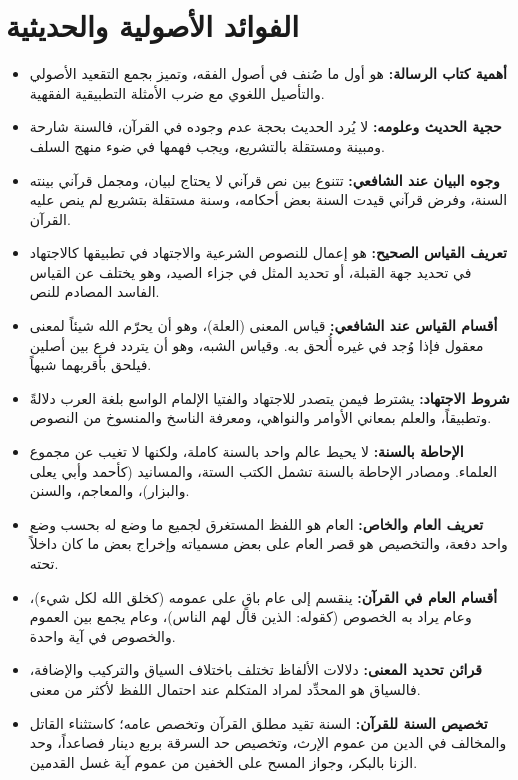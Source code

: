 \section{الفوائد الأصولية والحديثية}
\begin{itemize}
    \item \textbf{أهمية كتاب الرسالة:} هو أول ما صُنف في أصول الفقه، وتميز بجمع التقعيد الأصولي والتأصيل اللغوي مع ضرب الأمثلة التطبيقية الفقهية.
    \item \textbf{حجية الحديث وعلومه:} لا يُرد الحديث بحجة عدم وجوده في القرآن، فالسنة شارحة ومبينة ومستقلة بالتشريع، ويجب فهمها في ضوء منهج السلف.
    \item \textbf{وجوه البيان عند الشافعي:} تتنوع بين نص قرآني لا يحتاج لبيان، ومجمل قرآني بينته السنة، وفرض قرآني قيدت السنة بعض أحكامه، وسنة مستقلة بتشريع لم ينص عليه القرآن.
    \item \textbf{تعريف القياس الصحيح:} هو إعمال للنصوص الشرعية والاجتهاد في تطبيقها كالاجتهاد في تحديد جهة القبلة، أو تحديد المثل في جزاء الصيد، وهو يختلف عن القياس الفاسد المصادم للنص.
    \item \textbf{أقسام القياس عند الشافعي:} قياس المعنى (العلة)، وهو أن يحرّم الله شيئاً لمعنى معقول فإذا وُجد في غيره أُلحق به. وقياس الشبه، وهو أن يتردد فرع بين أصلين فيلحق بأقربهما شبهاً.
    \item \textbf{شروط الاجتهاد:} يشترط فيمن يتصدر للاجتهاد والفتيا الإلمام الواسع بلغة العرب دلالةً وتطبيقاً، والعلم بمعاني الأوامر والنواهي، ومعرفة الناسخ والمنسوخ من النصوص.
    \item \textbf{الإحاطة بالسنة:} لا يحيط عالم واحد بالسنة كاملة، ولكنها لا تغيب عن مجموع العلماء. ومصادر الإحاطة بالسنة تشمل الكتب الستة، والمسانيد (كأحمد وأبي يعلى والبزار)، والمعاجم، والسنن.
    \item \textbf{تعريف العام والخاص:} العام هو اللفظ المستغرق لجميع ما وضع له بحسب وضع واحد دفعة، والتخصيص هو قصر العام على بعض مسمياته وإخراج بعض ما كان داخلاً تحته.
    \item \textbf{أقسام العام في القرآن:} ينقسم إلى عام باقٍ على عمومه (كخلق الله لكل شيء)، وعام يراد به الخصوص (كقوله: الذين قال لهم الناس)، وعام يجمع بين العموم والخصوص في آية واحدة.
    \item \textbf{قرائن تحديد المعنى:} دلالات الألفاظ تختلف باختلاف السياق والتركيب والإضافة، فالسياق هو المحدِّد لمراد المتكلم عند احتمال اللفظ لأكثر من معنى.
    \item \textbf{تخصيص السنة للقرآن:} السنة تقيد مطلق القرآن وتخصص عامه؛ كاستثناء القاتل والمخالف في الدين من عموم الإرث، وتخصيص حد السرقة بربع دينار فصاعداً، وحد الزنا بالبكر، وجواز المسح على الخفين من عموم آية غسل القدمين.

\end{itemize}

